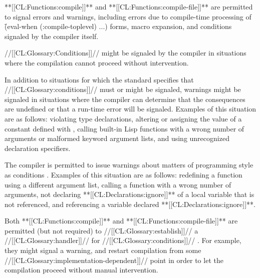 \endsubSection%






















**[[CL:Functions:compile]]** and **[[CL:Functions:compile-file]]** are permitted to
signal errors and warnings, including errors due to compile-time
processing of \f{(eval-when (:compile-toplevel) ...)} forms,
macro expansion, and conditions signaled by the compiler itself.
                                                
//[[CL:Glossary:Conditions]]//  might be signaled by the compiler
in situations where the compilation cannot proceed without intervention.  
 
In addition to situations for which the standard specifies that
//[[CL:Glossary:conditions]]//  must or might be signaled,
warnings might be signaled in situations where the compiler can
determine that the consequences are undefined or that a run-time
error will be signaled.  Examples of this situation are as follows: 
    violating type declarations,
    altering or assigning the value of a constant defined with ,
    calling built-in Lisp functions with a wrong number of arguments or malformed keyword
      argument lists, 
and using unrecognized declaration specifiers.
 
The compiler is permitted to issue warnings about matters of
programming style as conditions .
Examples of this situation are as follows:
      redefining a function using a different argument list,
      calling a function with a wrong number of arguments,
      not declaring **[[CL:Declarations:ignore]]** of a local variable that is not referenced,
  and referencing a variable declared **[[CL:Declarations:ignore]]**.





Both **[[CL:Functions:compile]]** and **[[CL:Functions:compile-file]]** are permitted
(but not required) to //[[CL:Glossary:establish]]// a //[[CL:Glossary:handler]]//
for //[[CL:Glossary:conditions]]// .  For example, they
might signal a warning, and restart compilation from some
//[[CL:Glossary:implementation-dependent]]// point in order to let the 
compilation proceed without manual intervention.

